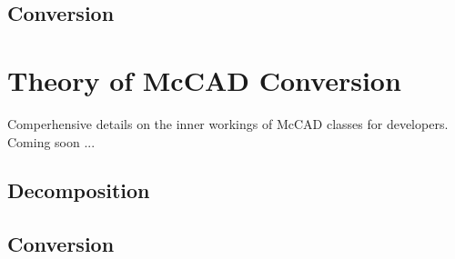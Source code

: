 \documentclass[letterpaper, 12 pt]{report}
\begin{document}
\subsection{Conversion}


\section{Theory of McCAD Conversion} \label{sec:theory}
Comperhensive details on the inner workings of McCAD classes for developers. Coming soon ...
\subsection{Decomposition}
\subsection{Conversion}
\newpage
%

\end{document}
